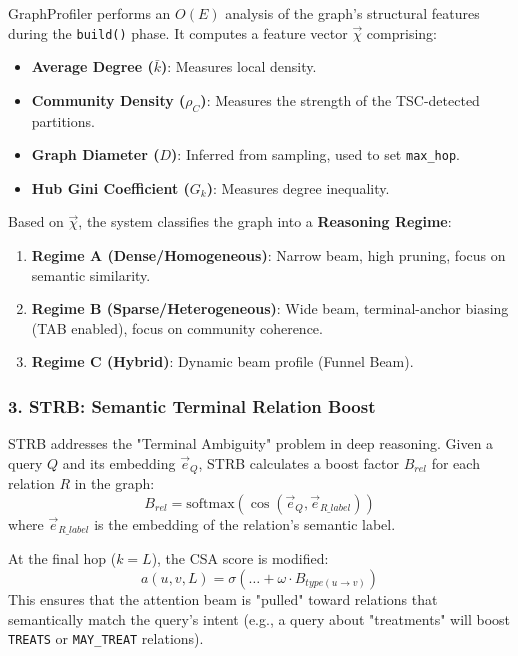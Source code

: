GraphProfiler performs an $O(E)$ analysis of the graph's structural features during the \texttt{build()} phase. It computes a feature vector $\vec{\chi}$ comprising:
\begin{itemize}
\item \textbf{Average Degree ($\bar{k}$)}: Measures local density.
\item \textbf{Community Density ($\rho_C$)}: Measures the strength of the TSC-detected partitions.
\item \textbf{Graph Diameter ($D$)}: Inferred from sampling, used to set \texttt{max\_hop}.
\item \textbf{Hub Gini Coefficient ($G_k$)}: Measures degree inequality.

\end{itemize}
Based on $\vec{\chi}$, the system classifies the graph into a \textbf{Reasoning Regime}:
\begin{enumerate}
\item \textbf{Regime A (Dense/Homogeneous)}: Narrow beam, high pruning, focus on semantic similarity.
\item \textbf{Regime B (Sparse/Hetero\-geneous)}: Wide beam, terminal-anchor biasing (TAB enabled), focus on community coherence.
\item \textbf{Regime C (Hybrid)}: Dynamic beam profile (Funnel Beam).

\end{enumerate}
\subsubsection{3. STRB: Semantic Terminal Relation Boost}

STRB addresses the "Terminal Ambiguity" problem in deep reasoning. Given a query $Q$ and its embedding $\vec{e}_Q$, STRB calculates a boost factor $B_{rel}$ for each relation $R$ in the graph:
\begin{equation}
B_{rel} = \text{softmax}(\cos(\vec{e}_Q, \vec{e}_{R\_label}))
\end{equation}
where $\vec{e}_{R\_label}$ is the embedding of the relation's semantic label.

At the final hop ($k = L$), the CSA score is modified:
\begin{equation}
a(u,v,L) = \sigma(\dots + \omega \cdot B_{type(u \to v)})
\end{equation}
This ensures that the attention beam is "pulled" toward relations that seman\-tically match the query's intent (e.g., a query about "treatments" will boost \texttt{TREATS} or \texttt{MAY\_TREAT} relations).

